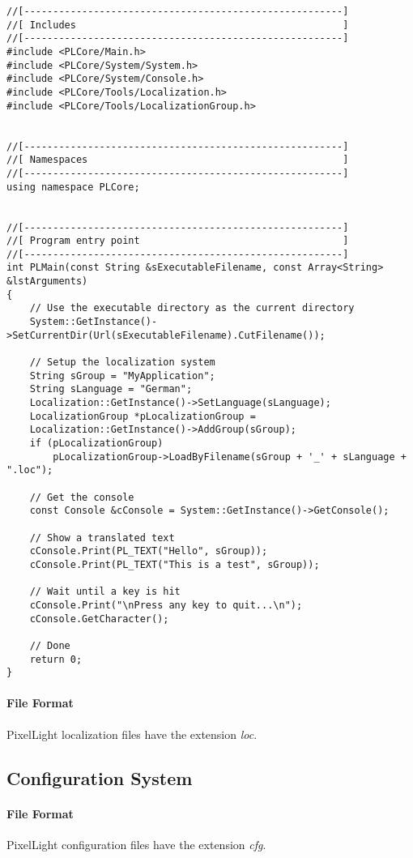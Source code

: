 \begin{lstlisting}[caption=Localization usage example]
//[-------------------------------------------------------]
//[ Includes                                              ]
//[-------------------------------------------------------]
#include <PLCore/Main.h>
#include <PLCore/System/System.h>
#include <PLCore/System/Console.h>
#include <PLCore/Tools/Localization.h>
#include <PLCore/Tools/LocalizationGroup.h>


//[-------------------------------------------------------]
//[ Namespaces                                            ]
//[-------------------------------------------------------]
using namespace PLCore;


//[-------------------------------------------------------]
//[ Program entry point                                   ]
//[-------------------------------------------------------]
int PLMain(const String &sExecutableFilename, const Array<String> &lstArguments)
{
	// Use the executable directory as the current directory
	System::GetInstance()->SetCurrentDir(Url(sExecutableFilename).CutFilename());

	// Setup the localization system
	String sGroup = "MyApplication";
	String sLanguage = "German";
	Localization::GetInstance()->SetLanguage(sLanguage);
	LocalizationGroup *pLocalizationGroup =
	Localization::GetInstance()->AddGroup(sGroup);
	if (pLocalizationGroup)
		pLocalizationGroup->LoadByFilename(sGroup + '_' + sLanguage + ".loc");

	// Get the console
	const Console &cConsole = System::GetInstance()->GetConsole();

	// Show a translated text
	cConsole.Print(PL_TEXT("Hello", sGroup));
	cConsole.Print(PL_TEXT("This is a test", sGroup));

	// Wait until a key is hit
	cConsole.Print("\nPress any key to quit...\n");
	cConsole.GetCharacter();

	// Done
	return 0;
}
\end{lstlisting}


\paragraph{File Format}
PixelLight localization files have the extension \emph{loc}.




\subsection{Configuration System}


\paragraph{File Format}
PixelLight configuration files have the extension \emph{cfg}.
